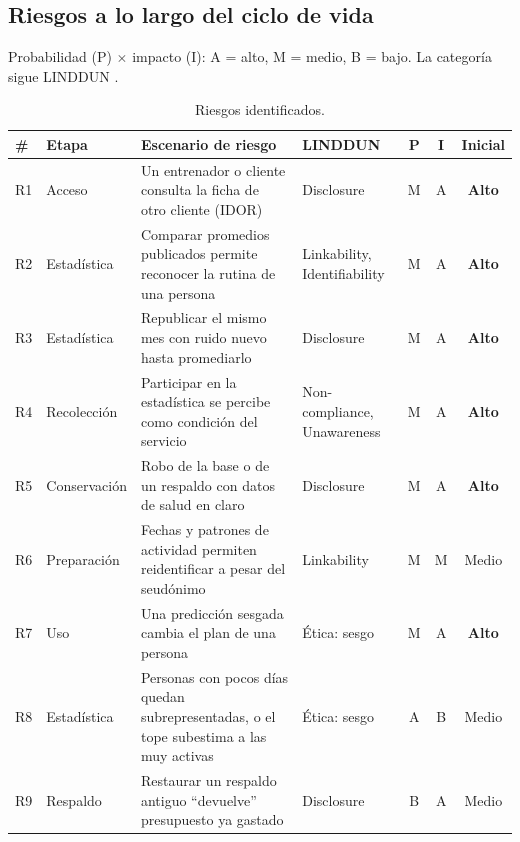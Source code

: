 \documentclass[11pt]{article}
\begin{document}
\subsection{Riesgos a lo largo del ciclo de vida}
Probabilidad (P) $\times$ impacto (I): A = alto, M = medio, B = bajo. La categoría sigue LINDDUN \cite{linddun}.

\begin{table}[H]
\centering\small
\begin{tabularx}{\textwidth}{@{}lp{1.9cm}Yp{2.6cm}ccc@{}}
\toprule
\textbf{\#} & \textbf{Etapa} & \textbf{Escenario de riesgo} & \textbf{LINDDUN} & \textbf{P} & \textbf{I} & \textbf{Inicial} \\
\midrule
R1 & Acceso & Un entrenador o cliente consulta la ficha de otro cliente (IDOR) & Disclosure & M & A & \textbf{Alto} \\
R2 & Estadística & Comparar promedios publicados permite reconocer la rutina de una persona & Linkability, Identifiability & M & A & \textbf{Alto} \\
R3 & Estadística & Republicar el mismo mes con ruido nuevo hasta promediarlo & Disclosure & M & A & \textbf{Alto} \\
R4 & Recolección & Participar en la estadística se percibe como condición del servicio & Non-compliance, Unawareness & M & A & \textbf{Alto} \\
R5 & Conservación & Robo de la base o de un respaldo con datos de salud en claro & Disclosure & M & A & \textbf{Alto} \\
R6 & Preparación & Fechas y patrones de actividad permiten reidentificar a pesar del seudónimo & Linkability & M & M & Medio \\
R7 & Uso & Una predicción sesgada cambia el plan de una persona & Ética: sesgo & M & A & \textbf{Alto} \\
R8 & Estadística & Personas con pocos días quedan subrepresentadas, o el tope subestima a las muy activas & Ética: sesgo & A & B & Medio \\
R9 & Respaldo & Restaurar un respaldo antiguo ``devuelve'' presupuesto ya gastado & Disclosure & B & A & Medio \\
\bottomrule
\end{tabularx}
\caption{Riesgos identificados.}
\end{table}
\end{document}
